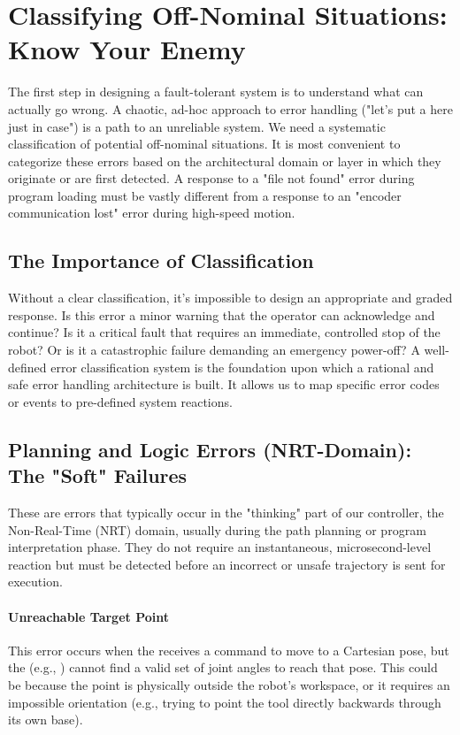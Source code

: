 \section{Classifying Off-Nominal Situations: Know Your Enemy}
\label{sec:error_classification}

The first step in designing a fault-tolerant system is to understand what can actually go wrong. A chaotic, ad-hoc approach to error handling ("let's put a  here just in case") is a path to an unreliable system. We need a systematic classification of potential off-nominal situations. It is most convenient to categorize these errors based on the architectural domain or layer in which they originate or are first detected. A response to a "file not found" error during program loading must be vastly different from a response to an "encoder communication lost" error during high-speed motion.

\subsection{The Importance of Classification}
\label{subsec:why_classify_errors}

Without a clear classification, it's impossible to design an appropriate and graded response. Is this error a minor warning that the operator can acknowledge and continue? Is it a critical fault that requires an immediate, controlled stop of the robot? Or is it a catastrophic failure demanding an emergency power-off? A well-defined error classification system is the foundation upon which a rational and safe error handling architecture is built. It allows us to map specific error codes or events to pre-defined system reactions.

\subsection{Planning and Logic Errors (NRT-Domain): The "Soft" Failures}
\label{subsec:nrt-domain-errors} %

These are errors that typically occur in the "thinking" part of our controller, the Non-Real-Time (NRT) domain, usually during the path planning or program interpretation phase. They do not require an instantaneous, microsecond-level reaction but must be detected before an incorrect or unsafe trajectory is sent for execution.

\paragraph{Unreachable Target Point}
This error occurs when the  receives a command to move to a Cartesian pose, but the  (e.g., ) cannot find a valid set of joint angles to reach that pose. This could be because the point is physically outside the robot's workspace, or it requires an impossible orientation (e.g., trying to point the tool directly backwards through its own base).

